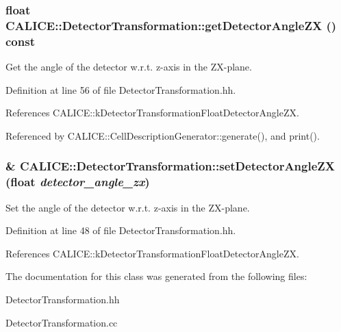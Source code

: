 \subsubsection[{getDetectorAngleZX}]{\setlength{\rightskip}{0pt plus 5cm}float CALICE::DetectorTransformation::getDetectorAngleZX () const\hspace{0.3cm}{\ttfamily  [inline]}}\label{classCALICE_1_1DetectorTransformation_a457ff79d33057315b535678a89c93baa}


Get the angle of the detector w.r.t. z-\/axis in the ZX-\/plane. 

Definition at line 56 of file DetectorTransformation.hh.

References CALICE::kDetectorTransformationFloatDetectorAngleZX.

Referenced by CALICE::CellDescriptionGenerator::generate(), and print().
\subsubsection[{setDetectorAngleZX}]{\& CALICE::DetectorTransformation::setDetectorAngleZX (float {\em detector\_\-angle\_\-zx})\hspace{0.3cm}{\ttfamily  [inline]}}\label{classCALICE_1_1DetectorTransformation_abda40c896fba1eb47056f69774f058b0}


Set the angle of the detector w.r.t. z-\/axis in the ZX-\/plane. 

Definition at line 48 of file DetectorTransformation.hh.

References CALICE::kDetectorTransformationFloatDetectorAngleZX.

The documentation for this class was generated from the following files:\begin{DoxyCompactItemize}
\item 
DetectorTransformation.hh\item 
DetectorTransformation.cc\end{DoxyCompactItemize}
